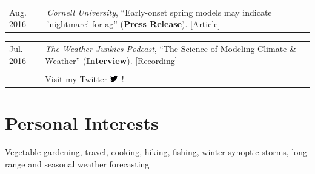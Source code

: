 \documentclass[margin,line,palatino,courier,10pt]{res}
\begin{document}
\begin{resume}
\begin{tabular}{@{}p{0.9in}p{4in}}
Aug. 2016 & \textit{Cornell University}, ``Early-onset spring models may indicate 'nightmare' for ag'' (\textbf{Press Release}). \href{http://www.news.cornell.edu/stories/2016/08/early-onset-spring-models-may-indicate-nightmare-ag}{[Article]}\\
\end{tabular}
\begin{tabular}{@{}p{0.9in}p{4in}}
Jul. 2016 & \textit{The Weather Junkies Podcast}, ``The Science of Modeling Climate \& Weather'' (\textbf{Interview}). \href{https://www.youtube.com/watch?v=vgT5P9zC91U}{[Recording]}\\\\

& Visit my \href{https://twitter.com/ZLabe}{Twitter} \includegraphics[height=9pt]{twitter.png}\ !\\
\end{tabular}

\vspace{-0.1in}
\noindent\textcolor{Cerulean}{\makebox[\linewidth][r]{\rule{\textwidth}{5pt}}}
\vspace{-0.3in}
\section{\sc \textcolor{Cerulean}{\large{\textbf{Personal Interests}}}}
Vegetable gardening, travel, cooking, hiking, fishing, winter synoptic storms, long-range and seasonal weather forecasting

\end{resume}
\end{document}
